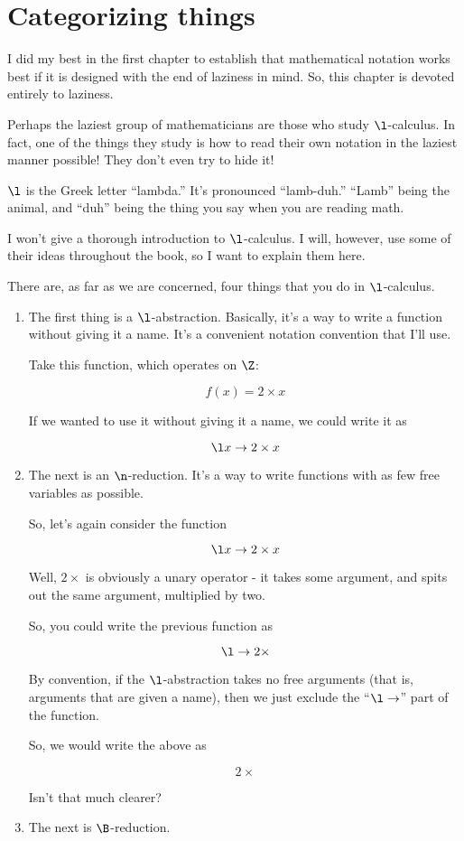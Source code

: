 \chapter{Categorizing things}

I did my best in the first chapter to establish that mathematical notation works
best if it is designed with the end of laziness in mind. So, this chapter is
devoted entirely to laziness. 

Perhaps the laziest group of mathematicians are those who study
$\l$-calculus. In fact, one of the things they study is how to read their own
notation in the laziest manner possible! They don't even try to hide it!

$\l$ is the Greek letter ``lambda.'' It's pronounced ``lamb-duh.'' ``Lamb''
being the animal, and ``duh'' being the thing you say when you are reading
math.

I won't give a thorough introduction to $\l$-calculus. I will, however, use some
of their ideas throughout the book, so I want to explain them here.

There are, as far as we are concerned, four things that you do in $\l$-calculus.

\begin{enumerate}
\item The first thing is a $\l$-abstraction. Basically, it's a way to write a
  function without giving it a name. It's a convenient notation convention that
  I'll use.
  
  Take this function, which operates on $\Z$:
  
  \[ f(x) = 2 \times x \]

  If we wanted to use it without giving it a name, we could write it as

  \[ \l x \to 2 \times x \]
  
\item The next is an $\n$-reduction. It's a way to write functions with as few
  free variables as possible.

  So, let's again consider the function
  
  \[ \l x \to 2 \times x \]
  
  Well, $2 \times$ is obviously a unary operator - it takes some argument, and
  spits out the same argument, multiplied by two.

  So, you could write the previous function as

  \[ \l \to 2 \times \]
  
  By convention, if the $\l$-abstraction takes no free arguments (that is,
  arguments that are given a name), then we just exclude the ``$\l \to$'' part
  of the function.

  So, we would write the above as

  \[ 2 \times \]
  
  Isn't that much clearer?
  
\item The next is $\B$-reduction.
\end{enumerate}
